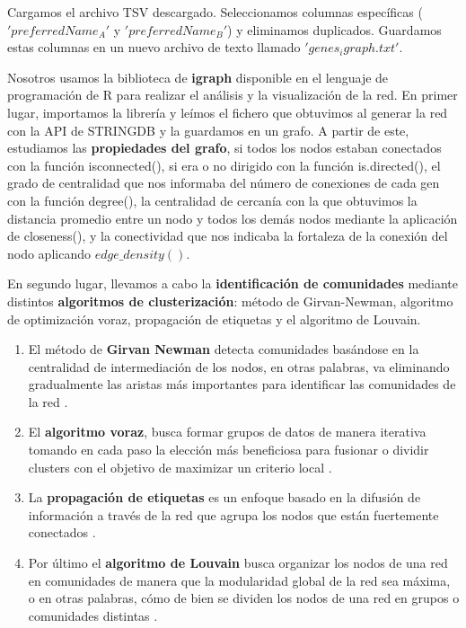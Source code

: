 Cargamos el archivo TSV descargado.
Seleccionamos columnas específicas ($'preferredName_A'$ y $'preferredName_B'$) y eliminamos duplicados.
Guardamos estas columnas en un nuevo archivo de texto llamado $'genes_igraph.txt'$.

Nosotros usamos la biblioteca de \textbf{igraph} disponible en el lenguaje de programación de R para realizar el análisis y la visualización de la red. En primer lugar, importamos la librería y leímos el fichero que obtuvimos al generar la red con la API de STRINGDB y la guardamos en un grafo. A partir de este, estudiamos las \textbf{propiedades del grafo}, si todos los nodos estaban conectados con la función isconnected(), si era o no dirigido con la función is.directed(), el grado de centralidad que nos informaba del número de conexiones de cada gen con la función degree(), la centralidad de cercanía con la que obtuvimos la distancia promedio entre un nodo y todos los demás nodos mediante la aplicación de closeness(), y la conectividad que nos indicaba la fortaleza de la conexión del nodo aplicando $edge\_density()$. 

\vspace{3pt}

En segundo lugar, llevamos a cabo la \textbf{identificación de comunidades} mediante distintos \textbf{algoritmos de clusterización}: método de Girvan-Newman, algoritmo de optimización voraz, propagación de etiquetas y el algoritmo de Louvain. 

\vspace{3pt}
\begin{enumerate}
\item El método de \textbf{Girvan Newman} detecta comunidades basándose en la centralidad de intermediación de los nodos, en otras palabras, va eliminando gradualmente las aristas más importantes para identificar las comunidades de la red \cite{Zahiri2023}.


\item El \textbf{algoritmo voraz}, busca formar grupos de datos de manera iterativa tomando en cada paso la elección más beneficiosa para fusionar o dividir clusters con el objetivo de maximizar un criterio local \cite{Curtis2003}. 


\item La \textbf{propagación de etiquetas} es un enfoque basado en la difusión de información a través de la red que agrupa los nodos que están fuertemente conectados \cite{Garza2019}.

\item Por último el \textbf{algoritmo de Louvain} busca organizar los nodos de una red en comunidades de manera que la modularidad global de la red sea máxima, o en otras palabras, cómo de bien se dividen los nodos de una red en grupos o comunidades distintas \cite{Zhang2021}.

\end{enumerate}

